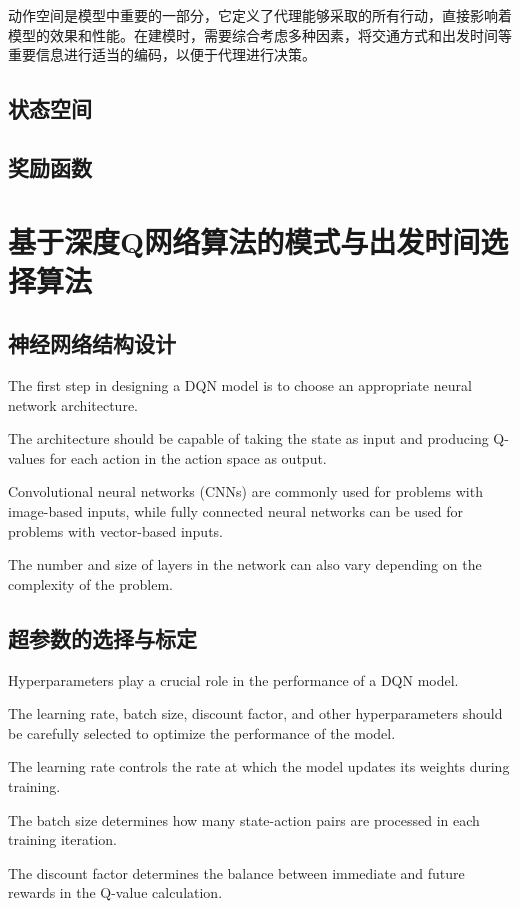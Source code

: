 动作空间是模型中重要的一部分，它定义了代理能够采取的所有行动，直接影响着模型的效果和性能。在建模时，需要综合考虑多种因素，将交通方式和出发时间等重要信息进行适当的编码，以便于代理进行决策。
\subsection{状态空间}
\subsection{奖励函数}

\section{基于深度Q网络算法的模式与出发时间选择算法}

\subsection{神经网络结构设计}

The first step in designing a DQN model is to choose an appropriate neural network architecture.

The architecture should be capable of taking the state as input and producing Q-values for each action in the action space as output.

Convolutional neural networks (CNNs) are commonly used for problems with image-based inputs, while fully connected neural networks can be used for problems with vector-based inputs.

The number and size of layers in the network can also vary depending on the complexity of the problem.

\subsection{超参数的选择与标定}

Hyperparameters play a crucial role in the performance of a DQN model.

The learning rate, batch size, discount factor, and other hyperparameters should be carefully selected to optimize the performance of the model.

The learning rate controls the rate at which the model updates its weights during training.

The batch size determines how many state-action pairs are processed in each training iteration.

The discount factor determines the balance between immediate and future rewards in the Q-value calculation.

